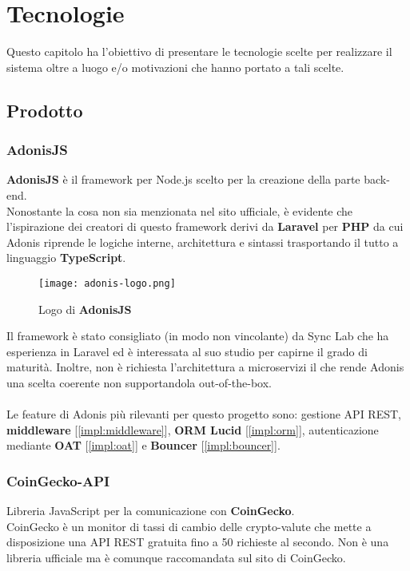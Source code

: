 
\chapter{Tecnologie}
\label{cap:tecnologie}
Questo capitolo ha l'obiettivo di presentare le tecnologie scelte per realizzare il sistema oltre a luogo e/o motivazioni che hanno portato a tali scelte.

\section{Prodotto}
    \subsection{AdonisJS}
    \label{tech:adonis}
    \textbf{AdonisJS} è il framework per Node.js scelto per la creazione della parte back-end.\\
    Nonostante la cosa non sia menzionata nel sito ufficiale, è evidente che l'ispirazione dei creatori di questo framework derivi da \textbf{Laravel} per \textbf{PHP} da cui Adonis riprende le logiche interne, architettura e sintassi trasportando il tutto a linguaggio \textbf{TypeScript}.

    \begin{figure}[h!]
        \centering
        \texttt{[image: adonis-logo.png]}
        \caption{Logo di \textbf{AdonisJS}}
    \end{figure}

    Il framework è stato consigliato (in modo non vincolante) da Sync Lab che ha esperienza in Laravel ed è interessata al suo studio per capirne il grado di maturità. Inoltre, non è richiesta l'architettura a microservizi il che rende Adonis una scelta coerente non supportandola out-of-the-box.
    \\\\
    Le feature di Adonis più rilevanti per questo progetto sono: gestione API REST, \textbf{middleware} [\autoref{impl:middleware}], \textbf{ORM Lucid} [\autoref{impl:orm}], autenticazione mediante \textbf{OAT} [\autoref{impl:oat}] e \textbf{Bouncer} [\autoref{impl:bouncer}].

    \subsection{CoinGecko-API}
    Libreria JavaScript per la comunicazione con \textbf{CoinGecko}.\\
    CoinGecko è un monitor di tassi di cambio delle crypto-valute che mette a disposizione una API REST gratuita fino a 50 richieste al secondo. Non è una libreria ufficiale ma è comunque raccomandata sul sito di CoinGecko.

